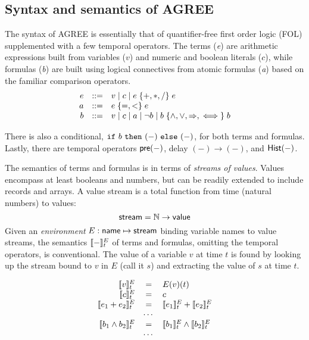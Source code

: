 \subsection{Syntax and semantics of AGREE}
\label{agree-semantics}

The syntax of AGREE is essentially that of quantifier-free first order
logic (FOL) supplemented with a few temporal operators. The terms
(\emph{e}) are arithmetic expressions built from variables ($v$) and
numeric and boolean literals ($c$), while formulas (\emph{b}) are
built using logical connectives from atomic formulas (\emph{a}) based
on the familiar comparison operators.
\[
\begin{array}{rcl}
e & ::= & v \mid c \mid e \;\{ {+,*,/} \}\; e \\
a & ::= & e\; \{ {=,<} \}\; e \\
b & ::= & v \mid c \mid a \mid \neg b
            \mid b \; \{ {\land,\lor,\Rightarrow,\iff} \}\; b
\end{array}
\]

There is also a conditional, $\mbox{$\mathtt{if}\ {b}\ \mathtt{then}\ {(-)}\ \mathtt{else}\ {(-)}$}$, for both terms
and formulas. Lastly, there are temporal operators $\mathsf{pre}(-)$,
delay $(-) \to (-)$, and $\mathsf{Hist}(-)$.

The semantics of terms and formulas is in terms of \emph{streams of
values}. Values encompass at least booleans and numbers, but can be
readily extended to include records and arrays. A value stream is a
total function from time (natural numbers) to values:
\[
 \mathsf{stream} = \mathbb{N} \to \mathsf{value}
\]
Given an \emph{environment} $E : \mathsf{name} \mapsto \mathsf{stream}$
binding variable names to value streams, the semantics $[\![ - ]\!]^E_t$
of terms and formulas, omitting the temporal operators, is
conventional. The value of a variable $v$ at time $t$ is found by
looking up the stream bound to $v$ in $E$ (call it $s$) and extracting
the value of $s$ at time $t$.

\[
\begin{array}{rcl}
\sem{v}^E_t & = & E(v)(t) \\
\sem{c}^E_t & = & c \\
\sem{e_1 + e_2}^E_t & = & \sem{e_1}^E_t + \sem{e_2}^E_t \\
   & \cdots & \\
\sem{b_1 \land b_2}^E_t & = & \sem{b_1}^E_t \land \sem{b_2}^E_t \\
   & \cdots & \\
\end{array}
\]

